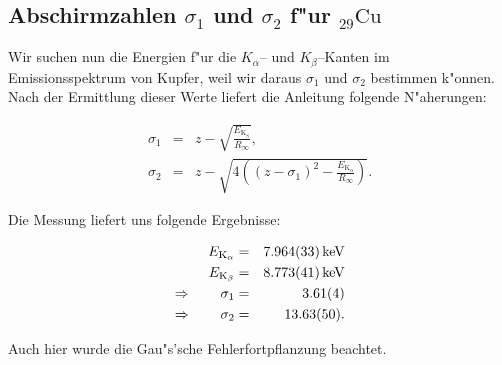 	\subsection{Abschirmzahlen $\sigma_1$ und $\sigma_2$ f"ur ${}_{29}^{}\mathrm{Cu}$}
		\label{subsec:kupfer}
		Wir suchen nun die Energien f"ur die $K_\alpha$-- und $K_\beta$--Kanten im Emissionsspektrum von Kupfer, weil wir daraus $\sigma_1$ und $\sigma_2$ bestimmen k"onnen.
		Nach der Ermittlung dieser Werte liefert die Anleitung folgende N"aherungen:

		\begin{eqnarray}
			\sigma_1 & = & z - \sqrt{\frac{E_\mathrm{K_\beta}}{R_\infty}} , \nonumber \\ 
			\sigma_2 & = & z - \sqrt{4\left(\left( z - \sigma_1 \right)^2 - \frac{E_\mathrm{K_\alpha}}{R_\infty} \right)} . \nonumber
		\end{eqnarray}

		Die Messung liefert uns folgende Ergebnisse:

		\begin{eqnarray}
			E_\mathrm{K_\alpha} & = & \SI{7.964 (33)}{\kilo \electronvolt} \nonumber \\
			E_\mathrm{K_\beta} & = & \SI{8.773 (41)}{\kilo \electronvolt} \nonumber \\
			\Rightarrow \qquad \sigma_1 & = & \SI{3.61 (4)}{} \nonumber \\
			\Rightarrow \qquad \sigma_2 & = & \SI{13.63 (50)}{} . \nonumber
		\end{eqnarray}

		Auch hier wurde die Gau"s'sche Fehlerfortpflanzung beachtet.